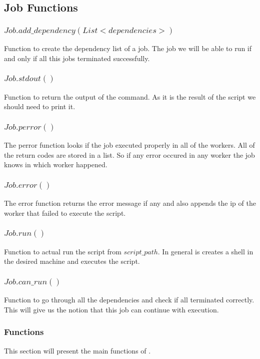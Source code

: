\subsection*{Job Functions}
\subsubsection*{$Job.add\_dependency(List <dependencies>)$}
Function to create the dependency list of a job. The job we will be
able to run if and only if all this jobs terminated successfully.
\subsubsection*{$Job.stdout()$}
Function to return the output of the command. As it is the result of the script we should need to print it.
\subsubsection*{$Job.perror()$}
The perror function looks if the job executed properly in all of the workers. All of the return codes are stored in a list. So if any error occured in any worker the job knows in which worker happened.
\subsubsection*{$Job.error()$}
The error function returns the error message if any and also appends the ip of the worker that failed to execute the script.
\subsubsection*{$Job.run()$}
Function to actual run the script from $script\_path$. In general is creates a shell in the desired machine
and executes the script.
\subsubsection*{$Job.can\_run()$}
Function to go through all the dependencies and check if all terminated correctly. This will give us the notion
that this job can continue with execution.

\subsubsection*{Functions}

This section will present the main functions of \lang{}.
